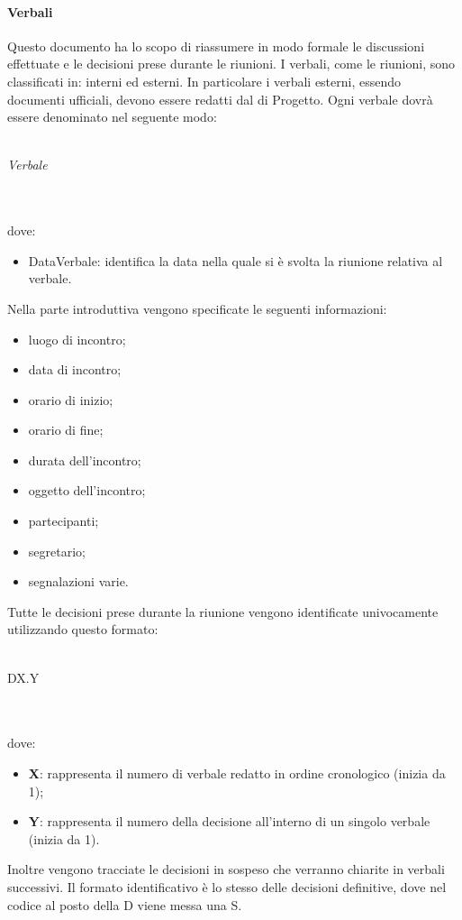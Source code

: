  \paragraph{Verbali}
Questo documento ha lo scopo di riassumere in modo formale le discussioni effettuate e le decisioni prese durante le riunioni. I verbali, come le riunioni, sono classificati in: interni ed esterni. In
particolare i verbali esterni, essendo documenti ufficiali, devono essere redatti dal \RESP{} di Progetto.
Ogni verbale dovrà essere denominato nel seguente modo:\\ \\
\centerline{\textit{Verbale}}
\\ \\
dove:
\begin{itemize}
	\item DataVerbale: identifica la data nella quale si è svolta la riunione relativa al verbale.
\end{itemize}
Nella parte introduttiva vengono specificate le seguenti informazioni:
\begin{itemize}
	\item luogo di incontro;
	\item data di incontro;
	\item orario di inizio;
	\item orario di fine;
	\item durata dell'incontro;
	\item oggetto dell'incontro;
	\item partecipanti;
	\item segretario;
	\item segnalazioni varie.
\end{itemize}
Tutte le decisioni prese durante la riunione vengono identificate univocamente utilizzando questo formato: \\ \\
\centerline{DX.Y} \\ \\
dove:
\begin{itemize}
	\item \textbf{X}: rappresenta il numero di verbale redatto in ordine cronologico (inizia da 1);
	\item \textbf{Y}: rappresenta il numero della decisione all'interno di un singolo verbale (inizia da 1).
\end{itemize}
Inoltre vengono tracciate le decisioni in sospeso che verranno chiarite in verbali successivi. Il formato identificativo è lo stesso delle decisioni definitive, dove nel codice al posto della D viene messa una S.
